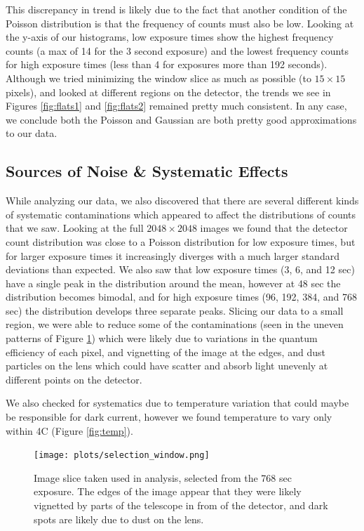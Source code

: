\documentclass[preprint]{aastex62}
\begin{document}
This discrepancy in trend is likely due to the fact that another condition of the Poisson distribution is that the frequency of counts must also be low. Looking at the y-axis of our histograms, low exposure times show the highest frequency counts (a max of 14 for the 3 second exposure) and the lowest frequency counts for high exposure times (less than 4 for exposures more than 192 seconds). Although we tried minimizing the window slice as much as possible (to $15\times15$ pixels), and looked at different regions on the detector, the trends we see in Figures \ref{fig:flats1} and \ref{fig:flats2} remained pretty much consistent. In any case, we conclude both the Poisson and Gaussian are both pretty good approximations to our data.

\subsection{Sources of Noise \& Systematic Effects} \label{subsec:systematics}
While analyzing our data, we also discovered that there are several different kinds of systematic contaminations which appeared to affect the distributions of counts that we saw. Looking at the full $2048\times2048$ images we found that the detector count distribution was close to a Poisson distribution for low exposure times, but for larger exposure times it increasingly diverges with a much larger standard deviations than expected. We also saw that low exposure times (3, 6, and 12 sec) have a single peak in the distribution around the mean, however at 48 sec the distribution becomes bimodal, and for high exposure times (96, 192, 384, and 768 sec) the distribution develops three separate peaks. Slicing our data to a small region, we were able to reduce some of the contaminations (seen in the uneven patterns of Figure \ref{fig:slice}) which were likely due to variations in the quantum efficiency of each pixel, and vignetting of the image at the edges, and dust particles on the lens which could have scatter and absorb light unevenly at different points on the detector.

We also checked for systematics due to temperature variation that could maybe be responsible for dark current, however we found temperature to vary only within 4C (Figure \ref{fig:temp}). 

\begin{figure}[H]
\begin{center}
\texttt{[image: plots/selection\_window.png]}
\caption{Image slice taken used in analysis, selected from the 768 sec exposure. The edges of the image appear that they were likely vignetted by parts of the telescope in from of the detector, and dark spots are likely due to dust on the lens.} \label{fig:slice}
\end{center}
\end{figure}
\end{document}
